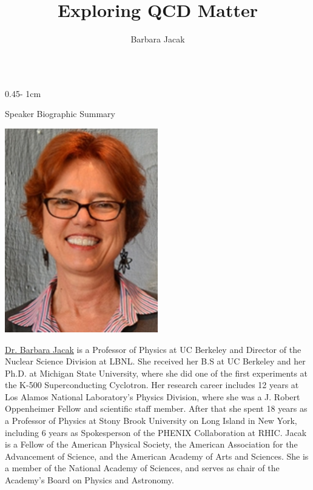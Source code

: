 \documentclass{../psuposter}
\title{Exploring QCD Matter}
\author{Barbara Jacak}
\institute{UC Berkeley and Lawrence Berkeley National Laboratory}
\begin{document}
\begin{frame}
\begin{columns}[t, totalwidth=\textwidth]
\begin{column}{0.45\textwidth - 1cm}


    \begin{block}{Speaker Biographic Summary}
    	\begin{center}
    		\includegraphics[width=0.5\textwidth]{images/portrait}
    	\end{center}
    	\href{}{Dr. Barbara Jacak} is a Professor of Physics at UC Berkeley and Director of the Nuclear Science Division at LBNL. She received her B.S at UC Berkeley and her Ph.D. at Michigan State University, where she did one of the first experiments at the K-500 Superconducting Cyclotron. Her research career includes 12 years at Los Alamos National Laboratory’s Physics Division, where she was a J. Robert Oppenheimer Fellow and scientific staff member. After that she spent 18 years as a Professor of Physics at Stony Brook University on Long Island in New York, including 6 years as Spokesperson of the PHENIX Collaboration at RHIC. Jacak is a Fellow of the American Physical Society, the American Association for the Advancement of Science, and the American Academy of Arts and Sciences. She is a member of the National Academy of Sciences, and serves as chair of the Academy’s Board on Physics and Astronomy.
    \end{block}



\end{column}
\end{columns}
\end{frame}
\end{document}
